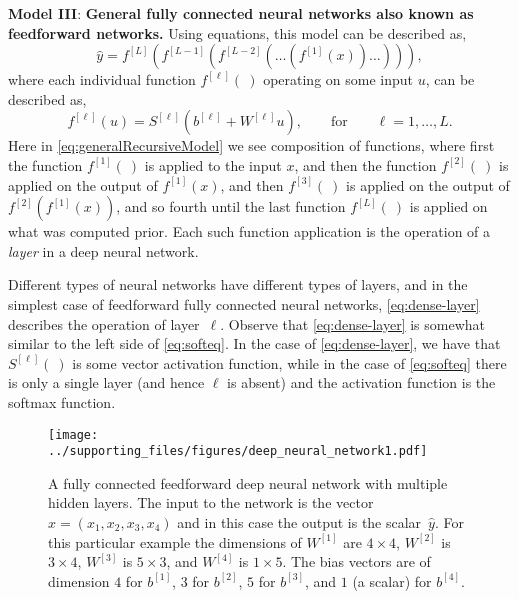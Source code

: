 \noindent
{\bf Model III}: {\bf General fully connected neural networks also known as feedforward networks.} Using equations, this model can be described as,
%
\begin{equation}
\label{eq:generalRecursiveModel}
\hat{y}=f^{[L]}(f^{[L-1]}(f^{[L-2]}(\ldots (f^{[1]}(x))\ldots))),
\end{equation}
%
where each individual function $f^{[\ell]}(~)$ operating on some input $u$, can be  described as,
%
\begin{equation}
\label{eq:dense-layer}
f^{[\ell]}(u) =
S^{[\ell]}(b^{[\ell]} + W^{[\ell]} u),
\qquad
\text{for}
\qquad
\ell = 1,\ldots,L.
\end{equation}
%
Here in \eqref{eq:generalRecursiveModel} we see composition of functions, where first the function $f^{[1]}(~)$ is applied to the input $x$, and then the function $f^{[2]}(~)$ is applied on the output of $f^{[1]}(x)$, and then $f^{[3]}(~)$ is applied on the output of $f^{[2]}(f^{[1]}(x))$, and so fourth until the last function $f^{[L]}(~)$ is applied on what was computed prior. Each such function application is the operation of a {\em layer} in a deep neural network. 

Different types of neural networks have different types of layers, and in the simplest case of feedforward fully connected neural networks, \eqref{eq:dense-layer} describes the operation of layer~$\ell$. Observe that \eqref{eq:dense-layer} is somewhat similar to the left side of \eqref{eq:softeq}. In the case of \eqref{eq:dense-layer}, we have that $S^{[\ell]}(~)$ is some vector activation function, while in the case of \eqref{eq:softeq} there is only a single layer (and hence $\ell$ is absent) and the activation function is the softmax function.  

\begin{figure}[h!] 
\begin{center}
\texttt{[image: ../supporting\_files/figures/deep\_neural\_network1.pdf]}
 \caption{A fully connected feedforward deep neural network with multiple hidden layers. The input to the network is the vector $x = (x_1, x_2, x_3, x_4)$ and in this case the output is the scalar~$\hat{y}$. For this particular example the dimensions of $W^{[1]}$ are $4\times 4$, $W^{[2]}$ is $3 \times 4$, $W^{[3]}$ is $5 \times 3$, and $W^{[4]}$ is $1 \times 5$. The bias vectors are of dimension $4$ for $b^{[1]}$, $3$ for $b^{[2]}$, $5$ for $b^{[3]}$, and $1$ (a scalar) for $b^{[4]}$.
 }
    \label{FFNN}
\end{center}
\end{figure}

